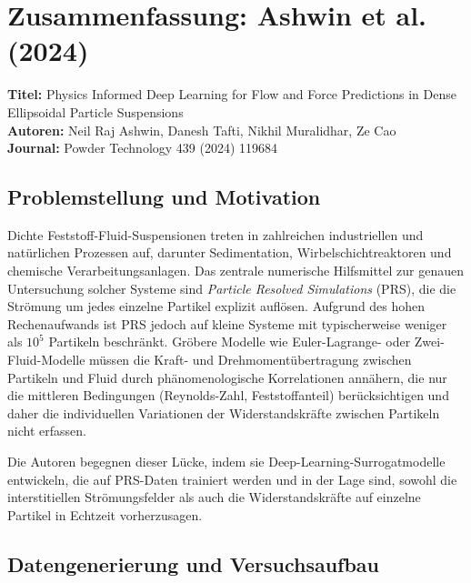 \documentclass[a4paper,12pt]{article}
\begin{document}
\section*{Zusammenfassung: Ashwin et al. (2024)}
\textbf{Titel:} Physics Informed Deep Learning for Flow and Force Predictions
in Dense Ellipsoidal Particle Suspensions \\
\textbf{Autoren:} Neil Raj Ashwin, Danesh Tafti, Nikhil Muralidhar, Ze Cao \\
\textbf{Journal:} Powder Technology 439 (2024) 119684

\subsection*{Problemstellung und Motivation}

Dichte Feststoff-Fluid-Suspensionen treten in zahlreichen industriellen und
natürlichen Prozessen auf, darunter Sedimentation, Wirbelschichtreaktoren und
chemische Verarbeitungsanlagen. Das zentrale numerische Hilfsmittel zur genauen
Untersuchung solcher Systeme sind \emph{Particle Resolved Simulations} (PRS), die
die Strömung um jedes einzelne Partikel explizit auflösen. Aufgrund des hohen
Rechenaufwands ist PRS jedoch auf kleine Systeme mit typischerweise weniger als
$10^5$ Partikeln beschränkt. Gröbere Modelle wie Euler-Lagrange- oder
Zwei-Fluid-Modelle müssen die Kraft- und Drehmomentübertragung zwischen
Partikeln und Fluid durch phänomenologische Korrelationen annähern, die nur
die mittleren Bedingungen (Reynolds-Zahl, Feststoffanteil) berücksichtigen und
daher die individuellen Variationen der Widerstandskräfte zwischen Partikeln
nicht erfassen.

Die Autoren begegnen dieser Lücke, indem sie Deep-Learning-Surrogatmodelle
entwickeln, die auf PRS-Daten trainiert werden und in der Lage sind, sowohl die
interstitiellen Strömungsfelder als auch die Widerstandskräfte auf einzelne
Partikel in Echtzeit vorherzusagen.

\subsection*{Datengenerierung und Versuchsaufbau}
\end{document}

